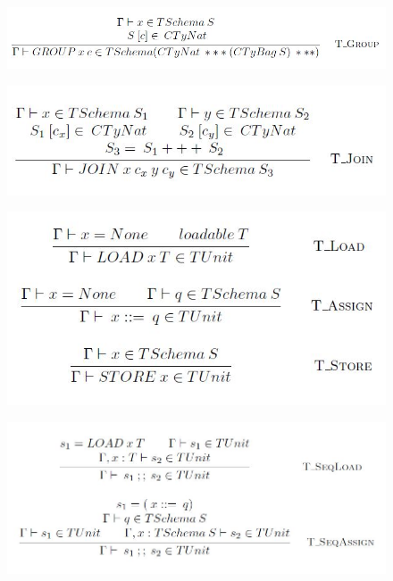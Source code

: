 \begin{figure}
\centering
  \includegraphics[width=1\linewidth]{Images/Group.JPG}
  \label{fig:group}
\end{figure}

\begin{figure}
  \centering
  \includegraphics[width=1\linewidth]{Images/Join.JPG}
  \label{fig:join}
\end{figure}

\begin{figure}
\centering
  \includegraphics[width=1\linewidth]{Images/Load_Assign_Store.JPG}
  \label{fig:load_assign_store}
\end{figure}

\begin{figure}
\centering
  \includegraphics[width=1\linewidth]{Images/SEQ1.JPG}
  \label{fig:seq1}
\end{figure}

